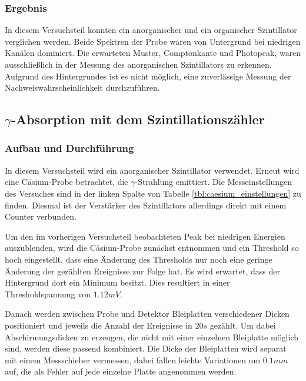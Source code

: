 \documentclass{../Misc/MontavonLaTeX/Montavon}
\begin{document}
\subsubsection{Ergebnis}
In diesem Versuchsteil konnten ein anorganischer und ein organischer Szintillator verglichen werden. Beide Spektren der  Probe waren von Untergrund bei niedrigen Kanälen dominiert. Die erwarteten Muster, Comptonkante und Photopeak, waren ausschließlich in der Messung des anorganischen Szintillators zu erkennen. 
Aufgrund des Hintergrundes ist es nicht möglich, eine zuverlässige Messung der Nachweiswahrscheinlichkeit durchzuführen.

\subsection{$\gamma$-Absorption mit dem Szintillationszähler}
\subsubsection{Aufbau und Durchführung}
In diesem Versuchsteil wird ein anorganischer Szintillator verwendet. Erneut wird eine Cäsium-Probe betrachtet, die $\gamma$-Strahlung emittiert. Die Messeinstellungen des Versuches sind in der linken Spalte von Tabelle \ref{tbl:caesium_einstellungen} zu finden.
Diesmal ist der Verstärker des Szintillators allerdings direkt mit einem Counter verbunden.

Um den im vorherigen Versuchsteil beobachteten Peak bei niedrigen Energien auszublenden, wird die Cäsium-Probe zunächst entnommen und ein Threshold so hoch eingestellt, dass eine Änderung des Thresholds nur noch eine geringe Änderung der gezählten Ereignisse zur Folge hat. Es wird erwartet, dass der Hintergrund dort ein Minimum besitzt. Dies resultiert in einer Thresholdspannung von $1.12 \unit{mV}$.

Danach werden zwischen Probe und Detektor Bleiplatten verschiedener Dicken positioniert und jeweils die Anzahl der Ereignisse in $20 \unit{s}$ gezählt. Um dabei Abschirmungsdicken zu erzeugen, die nicht mit einer einzelnen Bleiplatte möglich sind, werden diese passend kombiniert. Die Dicke der Bleiplatten wird separat mit einem Messschieber vermessen, dabei fallen leichte Variationen um $0.1 \unit{mm}$ auf, die als Fehler auf jede einzelne Platte angenommen werden.
\end{document}
